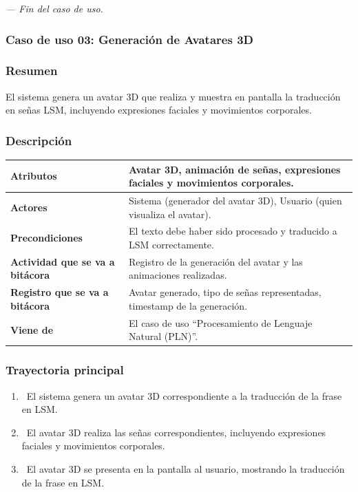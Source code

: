 \textit{--- Fin del caso de uso.}
\newpage
\subsubsection{Caso de uso 03: Generación de Avatares 3D}
\subsubsection{Resumen}
El sistema genera un avatar 3D que realiza y muestra en pantalla la traducción en señas LSM, incluyendo expresiones faciales y movimientos corporales.
\subsubsection{Descripción}
\begin{table}[h]
    \centering
    \begin{longtable}{|l|p{10cm}|}  %
    \hline
    \textbf{Atributos} & Avatar 3D, animación de señas, expresiones faciales y movimientos corporales. \\ \hline
    \textbf{Actores} & Sistema (generador del avatar 3D), Usuario (quien visualiza el avatar). \\ \hline
    \textbf{Precondiciones} & El texto debe haber sido procesado y traducido a LSM correctamente. \\ \hline
    \textbf{Actividad que se va a bitácora} & Registro de la generación del avatar y las animaciones realizadas. \\ \hline
    \textbf{Registro que se va a bitácora} & Avatar generado, tipo de señas representadas, timestamp de la generación. \\ \hline
    \textbf{Viene de} & El caso de uso “Procesamiento de Lenguaje Natural (PLN)”. \\ \hline
       
    \end{longtable}
\end{table}
    
\subsubsection{Trayectoria principal}
\begin{enumerate}[label=\textbf{\arabic*}, leftmargin=1.5cm]
    \item \UCsystem \ El sistema genera un avatar 3D correspondiente a la traducción de la frase en LSM.
    
    \item \UCsystem \ El avatar 3D realiza las señas correspondientes, incluyendo expresiones faciales y movimientos corporales.

    \item \UCsystem \ El avatar 3D se presenta en la pantalla al usuario, mostrando la traducción de la frase en LSM.

\end{enumerate}

